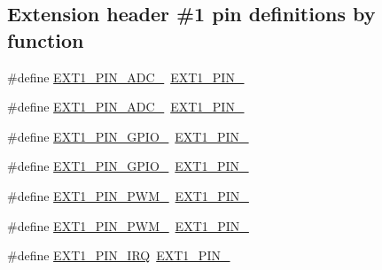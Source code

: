 \subsection*{Extension header \#1 pin definitions by function}
\begin{DoxyCompactItemize}
\item 
\#define \mbox{\hyperlink{group__samd21__xplained__pro__features__group_ga5cb1dd78b8ab2337a600ac1fb5952f98}{E\+X\+T1\+\_\+\+P\+I\+N\+\_\+\+A\+D\+C\+\_}}~\mbox{\hyperlink{group__samd21__xplained__pro__features__group_ga6ccee32105c9fafbb01770695b7f2b44}{E\+X\+T1\+\_\+\+P\+I\+N\+\_}}
\item 
\#define \mbox{\hyperlink{group__samd21__xplained__pro__features__group_gab5927d53d39f07615e31de423b5cd2f8}{E\+X\+T1\+\_\+\+P\+I\+N\+\_\+\+A\+D\+C\+\_}}~\mbox{\hyperlink{group__samd21__xplained__pro__features__group_ga5243ef88b70ab0ee20507c80ef8d7a0d}{E\+X\+T1\+\_\+\+P\+I\+N\+\_}}
\item 
\#define \mbox{\hyperlink{group__samd21__xplained__pro__features__group_gafbdd5cd8e6664c704b7e1d62a50bb9fc}{E\+X\+T1\+\_\+\+P\+I\+N\+\_\+\+G\+P\+I\+O\+\_}}~\mbox{\hyperlink{group__samd21__xplained__pro__features__group_ga5ca695ea694bce97dfb20e52de5b4a15}{E\+X\+T1\+\_\+\+P\+I\+N\+\_}}
\item 
\#define \mbox{\hyperlink{group__samd21__xplained__pro__features__group_ga694376ccdf6ec8fb0101121fe0dd2bd6}{E\+X\+T1\+\_\+\+P\+I\+N\+\_\+\+G\+P\+I\+O\+\_}}~\mbox{\hyperlink{group__samd21__xplained__pro__features__group_ga6c808d0df1d56c22b669269ba2a8ccce}{E\+X\+T1\+\_\+\+P\+I\+N\+\_}}
\item 
\#define \mbox{\hyperlink{group__samd21__xplained__pro__features__group_ga5c60de0dd8e1c11f58a368792e8ab86e}{E\+X\+T1\+\_\+\+P\+I\+N\+\_\+\+P\+W\+M\+\_}}~\mbox{\hyperlink{group__samd21__xplained__pro__features__group_gaf90fe93609fea05220738c06abaabf71}{E\+X\+T1\+\_\+\+P\+I\+N\+\_}}
\item 
\#define \mbox{\hyperlink{group__samd21__xplained__pro__features__group_gac96b2c63e08f74698ce613d73a54bc3b}{E\+X\+T1\+\_\+\+P\+I\+N\+\_\+\+P\+W\+M\+\_}}~\mbox{\hyperlink{group__samd21__xplained__pro__features__group_ga4768b3de92f5776c206a4e3262f05c47}{E\+X\+T1\+\_\+\+P\+I\+N\+\_}}
\item 
\#define \mbox{\hyperlink{group__samd21__xplained__pro__features__group_ga3ebd8ed9b501a9b88623b0a084ec098b}{E\+X\+T1\+\_\+\+P\+I\+N\+\_\+\+I\+RQ}}~\mbox{\hyperlink{group__samd21__xplained__pro__features__group_ga8c0f8b12c67dfecaac7bb4c45990fb57}{E\+X\+T1\+\_\+\+P\+I\+N\+\_}}

\end{DoxyCompactItemize}
